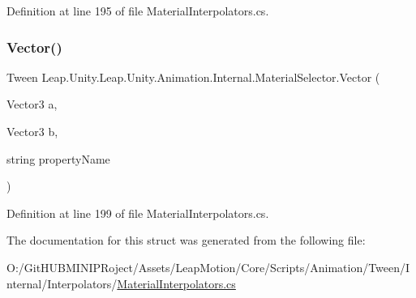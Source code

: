 Definition at line 195 of file Material\+Interpolators.\+cs.

\mbox{\label{struct_leap_1_1_unity_1_1_leap_1_1_unity_1_1_animation_1_1_internal_1_1_material_selector_a4e7cfa5a35ec519fa675ea1e302fa0cd}} 
\subsubsection{\texorpdfstring{Vector()}{Vector()}\hspace{0.1cm}{\footnotesize\ttfamily [4/4]}}
{\footnotesize\ttfamily Tween Leap.\+Unity.\+Leap.\+Unity.\+Animation.\+Internal.\+Material\+Selector.\+Vector (\begin{DoxyParamCaption}\item[{Vector3}]{a,  }\item[{Vector3}]{b,  }\item[{string}]{property\+Name }\end{DoxyParamCaption})}



Definition at line 199 of file Material\+Interpolators.\+cs.



The documentation for this struct was generated from the following file\+:\begin{DoxyCompactItemize}
\item 
O\+:/\+Git\+H\+U\+B\+M\+I\+N\+I\+P\+Roject/\+Assets/\+Leap\+Motion/\+Core/\+Scripts/\+Animation/\+Tween/\+Internal/\+Interpolators/\mbox{\hyperlink{_material_interpolators_8cs}{Material\+Interpolators.\+cs}}\end{DoxyCompactItemize}
